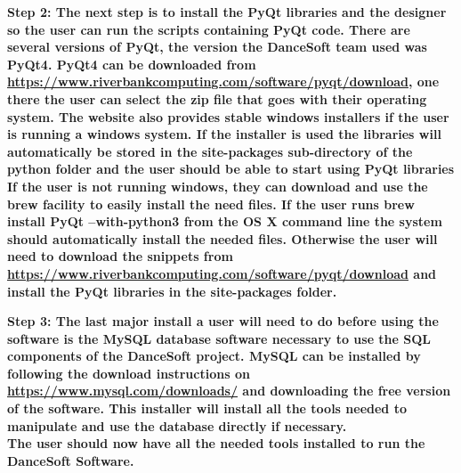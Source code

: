 \bf Step 2: \rm
	The next step is to install the PyQt libraries and the designer so the user can run the scripts containing PyQt code. There are several versions of PyQt, the version the DanceSoft team used was PyQt4. PyQt4 can be downloaded from \url{https://www.riverbankcomputing.com/software/pyqt/download}, one there the user can select the zip file that goes with their operating system. The website also provides stable windows installers if the user is running a windows system. If the installer is used the libraries will automatically be stored in the site-packages sub-directory of the python folder and the user should be able to start using PyQt libraries
	If the user is not running windows, they can download and use the brew facility to easily install the need files. If the user runs \bf brew install PyQt --with-python3 \rm from the OS X command line the system should automatically install the needed files.
	 Otherwise the user will need to download the snippets from \url{https://www.riverbankcomputing.com/software/pyqt/download} and install the PyQt libraries in the site-packages folder.
	 
\bf Step 3: \rm
	The last major install a user will need to do before using the software is the MySQL database software necessary to use the SQL components of the DanceSoft project.
	MySQL can be installed by following the download instructions on \url{https://www.mysql.com/downloads/} and downloading the free version of the software. This installer will install all the tools needed to manipulate and use the database directly if necessary.\\
	
The user should now have all the needed tools installed to run the DanceSoft Software.
	 
	



